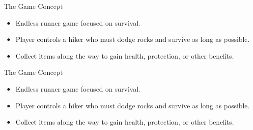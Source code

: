 
\begin{frame}{The Game Concept}
    \begin{itemize}
        \item Endless runner game focused on survival.
        \item Player controls a hiker who must dodge rocks and survive as long as possible.
        \item Collect items along the way to gain health, protection, or other benefits.
    \end{itemize}
\end{frame}

\begin{frame}{The Game Concept}
    \begin{itemize}
        \item Endless runner game focused on survival.
        \item Player controls a hiker who must dodge rocks and survive as long as possible.
        \item Collect items along the way to gain health, protection, or other benefits.
    \end{itemize}
\end{frame}
